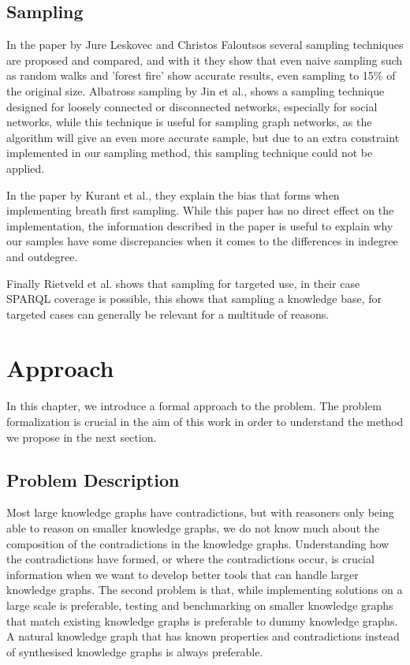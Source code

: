 \documentclass[11pt,letterpaper ,oneside ]{book}
\begin{document}
	\section{Sampling}
	In the paper by Jure Leskovec and Christos Faloutsos \cite{Leskovec:2006} several sampling techniques are proposed and compared, and with it they show that even naive sampling such as random walks and 'forest fire' show accurate results, even sampling to 15\% of the original size. 
	Albatross sampling by Jin et al.\cite{Jin:2011}, shows a sampling technique designed for loosely connected or disconnected networks, especially for social networks, while this technique is useful for sampling graph networks, as the algorithm will give an even more accurate sample, but due to an extra constraint implemented in our sampling method, this sampling technique could not be applied.
	
	In the paper by Kurant et al.\cite{Kurant:2011}, they explain the bias that forms when implementing breath first sampling.
	While this paper has no direct effect on the implementation, the information described in the paper is useful to explain why our samples have some discrepancies when it comes to the differences in indegree and outdegree. 
	
	Finally Rietveld et al.\cite{Rietveld:2014} shows that sampling for targeted use, in their case SPARQL coverage is possible, this shows that sampling a knowledge base, for targeted cases can generally be relevant for a multitude of reasons.
	
	
	\newpage
	\chapter{Approach}\label{ProblemDefintion}
	In this chapter, we introduce a formal approach to the problem. The problem formalization is crucial in the aim of this work in order to understand the method we propose in the next section.
	
	\section{Problem Description}
	Most large knowledge graphs have contradictions, but with reasoners only being able to reason on smaller knowledge graphs, we do not know much about the composition of the contradictions in the knowledge graphs. Understanding how the contradictions have formed, or where the contradictions occur, is crucial information when we want to develop better tools that can handle larger knowledge graphs. The second problem is that, while implementing solutions on a large scale is preferable, testing and benchmarking on smaller knowledge graphs that match existing knowledge graphs is preferable to dummy knowledge graphs. A natural knowledge graph that has known properties and contradictions instead of synthesised knowledge graphs is always preferable. 
	
\end{document}
